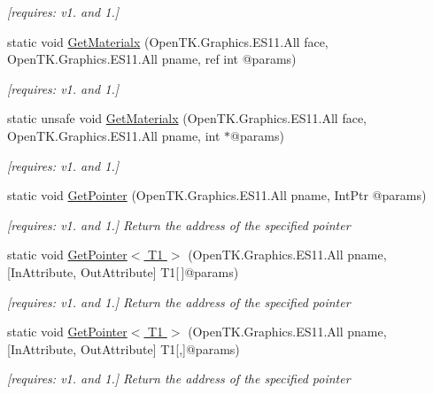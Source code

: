 \begin{DoxyCompactItemize}
\begin{DoxyCompactList}\small\item\em \mbox{[}requires\-: v1. and 1.\mbox{]}\end{DoxyCompactList}\item 
static void \hyperlink{class_open_t_k_1_1_graphics_1_1_e_s11_1_1_g_l_a109208adb0b69cb55361b47ca97089ae}{Get\-Materialx} (Open\-T\-K.\-Graphics.\-E\-S11.\-All face, Open\-T\-K.\-Graphics.\-E\-S11.\-All pname, ref int @params)
\begin{DoxyCompactList}\small\item\em \mbox{[}requires\-: v1. and 1.\mbox{]}\end{DoxyCompactList}\item 
static unsafe void \hyperlink{class_open_t_k_1_1_graphics_1_1_e_s11_1_1_g_l_aac44ee2be92872a0a133bfc168c311c2}{Get\-Materialx} (Open\-T\-K.\-Graphics.\-E\-S11.\-All face, Open\-T\-K.\-Graphics.\-E\-S11.\-All pname, int $\ast$@params)
\begin{DoxyCompactList}\small\item\em \mbox{[}requires\-: v1. and 1.\mbox{]}\end{DoxyCompactList}\item 
static void \hyperlink{class_open_t_k_1_1_graphics_1_1_e_s11_1_1_g_l_aa7f5feec30797c9c5a6c3d62d8b99dfd}{Get\-Pointer} (Open\-T\-K.\-Graphics.\-E\-S11.\-All pname, Int\-Ptr @params)
\begin{DoxyCompactList}\small\item\em \mbox{[}requires\-: v1. and 1.\mbox{]} Return the address of the specified pointer \end{DoxyCompactList}\item 
static void \hyperlink{class_open_t_k_1_1_graphics_1_1_e_s11_1_1_g_l_a97097a82b10397a188e01321ac1df18b}{Get\-Pointer$<$ T1 $>$} (Open\-T\-K.\-Graphics.\-E\-S11.\-All pname, \mbox{[}In\-Attribute, Out\-Attribute\mbox{]} T1\mbox{[}$\,$\mbox{]}@params)
\begin{DoxyCompactList}\small\item\em \mbox{[}requires\-: v1. and 1.\mbox{]} Return the address of the specified pointer \end{DoxyCompactList}\item 
static void \hyperlink{class_open_t_k_1_1_graphics_1_1_e_s11_1_1_g_l_ae59fad2314478e2e400380bff52270ac}{Get\-Pointer$<$ T1 $>$} (Open\-T\-K.\-Graphics.\-E\-S11.\-All pname, \mbox{[}In\-Attribute, Out\-Attribute\mbox{]} T1\mbox{[},\mbox{]}@params)
\begin{DoxyCompactList}\small\item\em \mbox{[}requires\-: v1. and 1.\mbox{]} Return the address of the specified pointer \end{DoxyCompactList}\item 

\end{DoxyCompactItemize}
